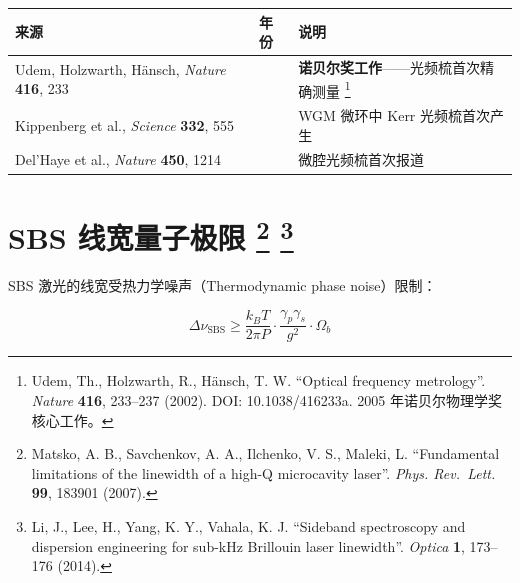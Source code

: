 \documentclass[
  11pt,
  a4paper,
]{ctexrep}
\newcounter{none} %
\begin{document}
{\def\LTcaptype{none} %
\begin{longtable}[]{@{}
  >{\raggedright\arraybackslash}p{}
  >{\centering\arraybackslash}p{}
  >{\raggedright\arraybackslash}p{}@{}}
\toprule\noalign{}
\begin{minipage}[b]{\linewidth}\raggedright
来源
\end{minipage} & \begin{minipage}[b]{\linewidth}\centering
年份
\end{minipage} & \begin{minipage}[b]{\linewidth}\raggedright
说明
\end{minipage} \\
\midrule\noalign{}
\endhead
\bottomrule\noalign{}
\endlastfoot
Udem, Holzwarth, Hänsch, \emph{Nature} \textbf{416}, 233 & 2002 &
\textbf{诺贝尔奖工作}------光频梳首次精确测量 \footnote{Udem, Th.,
  Holzwarth, R., Hänsch, T. W. ``Optical frequency metrology''.
  \emph{Nature} \textbf{416}, 233--237 (2002). DOI: 10.1038/416233a.
  2005 年诺贝尔物理学奖核心工作。} \\
Kippenberg et al., \emph{Science} \textbf{332}, 555 & 2011 & WGM 微环中
Kerr 光频梳首次产生 \\
Del'Haye et al., \emph{Nature} \textbf{450}, 1214 & 2007 &
微腔光频梳首次报道 \\
\end{longtable}
}

\section[SBS 线宽量子极限 ]{\texorpdfstring{SBS 线宽量子极限 \footnote{Matsko,
  A. B., Savchenkov, A. A., Ilchenko, V. S., Maleki, L. ``Fundamental
  limitations of the linewidth of a high-Q microcavity laser''.
  \emph{Phys. Rev.~Lett.} \textbf{99}, 183901 (2007).}
\footnote{Li, J., Lee, H., Yang, K. Y., Vahala, K. J. ``Sideband
  spectroscopy and dispersion engineering for sub-kHz Brillouin laser
  linewidth''. \emph{Optica} \textbf{1}, 173--176 (2014).}}{SBS 线宽量子极限  }}\label{sbs-ux7ebfux5bbdux91cfux5b50ux6781ux9650-matsko-linewidth-li-optica}

SBS 激光的线宽受热力学噪声（Thermodynamic phase noise）限制：

\[ \Delta\nu_{\text{SBS}} \geq \frac{k_B T}{2\pi P} \cdot \frac{\gamma_p\gamma_s}{g^2} \cdot \Omega_b \]
\end{document}
